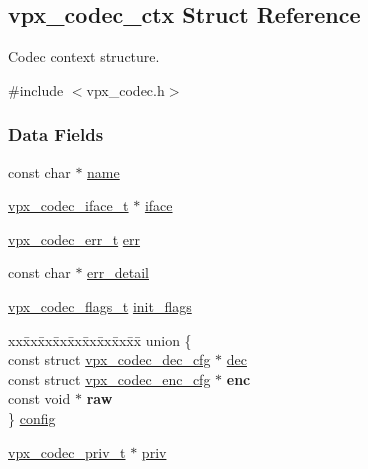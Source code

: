 \hypertarget{structvpx__codec__ctx}{}\subsection{vpx\+\_\+codec\+\_\+ctx Struct Reference}
\label{structvpx__codec__ctx}


Codec context structure.  




{\ttfamily \#include $<$vpx\+\_\+codec.\+h$>$}

\subsubsection*{Data Fields}
\begin{DoxyCompactItemize}
\item 
const char $\ast$ \hyperlink{structvpx__codec__ctx_a7ed1bf8f6434ea2df01da8011849c6cb}{name}
\item 
\hyperlink{group__codec_gae99c3b04f4a567a311211cce3ae6b83b}{vpx\+\_\+codec\+\_\+iface\+\_\+t} $\ast$ \hyperlink{structvpx__codec__ctx_af5986790e3420beda77f3a9b64f6b953}{iface}
\item 
\hyperlink{group__codec_gada1084710837ad363b92f2379dd2b8d2}{vpx\+\_\+codec\+\_\+err\+\_\+t} \hyperlink{structvpx__codec__ctx_a6f448802b0675013fd8c5179675c30de}{err}
\item 
const char $\ast$ \hyperlink{structvpx__codec__ctx_ad785c88ae862dd9129965c72723260bd}{err\+\_\+detail}
\item 
\hyperlink{group__codec_ga3b36d5af89ddc463489fe5bde0a57877}{vpx\+\_\+codec\+\_\+flags\+\_\+t} \hyperlink{structvpx__codec__ctx_a76546548086c060a6bd21cb55037fb2b}{init\+\_\+flags}
\item 
\begin{tabbing}
xx\=xx\=xx\=xx\=xx\=xx\=xx\=xx\=xx\=\kill
union \{\\
\>const struct \hyperlink{structvpx__codec__dec__cfg}{vpx\_codec\_dec\_cfg} $\ast$ \hyperlink{structvpx__codec__ctx_a3033c08dd62713d56d875ea51575bd2b}{dec}\\
\>const struct \hyperlink{structvpx__codec__enc__cfg}{vpx\_codec\_enc\_cfg} $\ast$ {\bfseries enc}\\
\>const void $\ast$ {\bfseries raw}\\
\} \hyperlink{structvpx__codec__ctx_a3ae36229fb0ec0b537a2b236e6f1b11b}{config}\\

\end{tabbing}\item 
\hyperlink{group__codec_ga1e262f91be9141a7176335fd409397ab}{vpx\+\_\+codec\+\_\+priv\+\_\+t} $\ast$ \hyperlink{structvpx__codec__ctx_acee775fd5b7580e112e245ce39733f92}{priv}
\end{DoxyCompactItemize}



